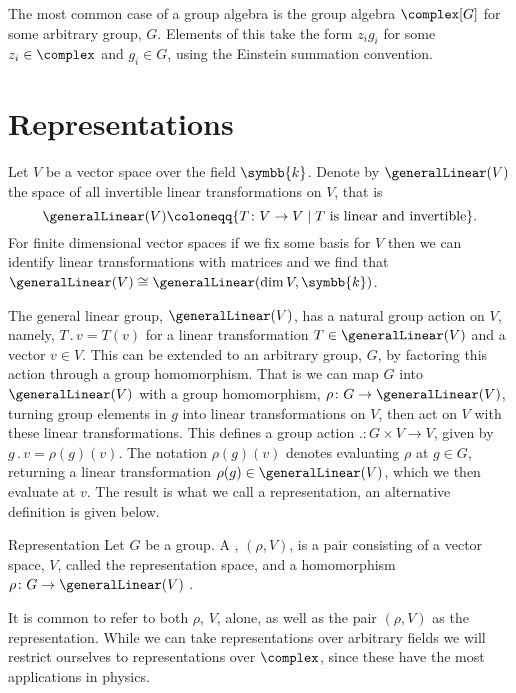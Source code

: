 \documentclass[fleqn]{NotesClass}
\renewcommand{\field}{\symbb{k}}
\newcommand{\action}{\mathbin{.}}
\newcommand{\isomorphic}{\cong}
\begin{document}
    The most common case of a group algebra is the group algebra \(\complex[G]\) for some arbitrary group, \(G\).
    Elements of this take the form \(z_i g_i\) for some \(z_i \in \complex\) and \(g_i \in G\), using the Einstein summation convention.
    
    \section{Representations}%
    Let \(V\) be a vector space over the field \(\field\).
    Denote by \(\generalLinear(V)\) the space of all invertible linear transformations on \(V\), that is
    \begin{equation}
        \generalLinear(V) \coloneqq \{T \colon V \to V \mid T \text{ is linear and invertible}\}.
    \end{equation}
    For finite dimensional vector spaces if we fix some basis for \(V\) then we can identify linear transformations with matrices and we find that \(\generalLinear(V) \isomorphic \generalLinear(\dim V, \field)\).
    
    The general linear group, \(\generalLinear(V)\), has a natural group action on \(V\), namely, \(T \action v = T(v)\) for a linear transformation \(T \in \generalLinear(V)\) and a vector \(v \in V\).
    This can be extended to an arbitrary group, \(G\), by factoring this action through a group homomorphism.
    That is we can map \(G\) into \(\generalLinear(V)\) with a group homomorphism, \(\rho \colon G \to \generalLinear(V)\), turning group elements in \(g\) into linear transformations on \(V\), then act on \(V\) with these linear transformations.
    This defines a group action \(\action \colon G \times V \to V\), given by \(g \action v = \rho(g)(v)\).
    The notation \(\rho(g)(v)\) denotes evaluating \(\rho\) at \(g \in G\), returning a linear transformation \(\rho(g) \in \generalLinear(V)\), which we then evaluate at \(v\).
    The result is what we call a representation, an alternative definition is given below.
    
    \begin{dfn}{Representation}{}
        Let \(G\) be a group.
        A , \((\rho, V)\), is a pair consisting of a vector space, \(V\), called the representation space, and a homomorphism \(\rho \colon G \to \generalLinear(V)\) \cite[726]{hassani}.
    \end{dfn}
    
    It is common to refer to both \(\rho\), \(V\), alone, as well as the pair \((\rho, V)\) as the representation.
    While we can take representations over arbitrary fields we will restrict ourselves to representations over \(\complex\), since these have the most applications in physics.
    
\end{document}
